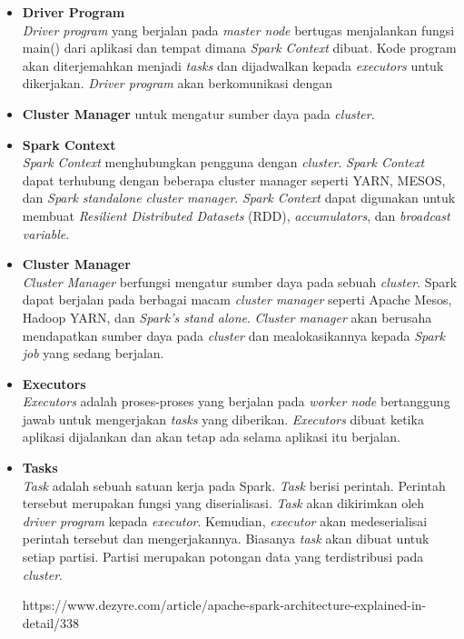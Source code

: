 \begin{itemize} 

\item \textbf{Driver Program}\\
\textit{Driver program} yang berjalan pada \textit{master node} bertugas menjalankan fungsi main() dari aplikasi dan tempat dimana \textit{Spark Context} dibuat. Kode program akan diterjemahkan menjadi \textit{tasks} dan dijadwalkan kepada \textit{executors} untuk dikerjakan. \textit{Driver program} akan berkomunikasi dengan \item \textbf{Cluster Manager} untuk mengatur sumber daya pada \textit{cluster}.\\

\item \textbf{Spark Context}\\
\textit{Spark Context} menghubungkan pengguna dengan \textit{cluster}. \textit{Spark Context} dapat terhubung dengan beberapa cluster manager seperti YARN, MESOS, dan \textit{Spark standalone cluster manager}. \textit{Spark Context} dapat digunakan untuk membuat \textit{Resilient Distributed Datasets} (RDD), \textit{accumulators}, dan \textit{broadcast variable}. 

\item \textbf{Cluster Manager}\\
\textit{Cluster Manager} berfungsi mengatur sumber daya pada sebuah \textit{cluster}. Spark dapat berjalan pada berbagai macam \textit{cluster manager} seperti Apache Mesos, Hadoop YARN, dan \textit{Spark's stand alone}. \textit{Cluster manager} akan berusaha mendapatkan sumber daya pada \textit{cluster} dan mealokasikannya kepada \textit{Spark job} yang sedang berjalan.

\item \textbf{Executors}\\
\textit{Executors} adalah proses-proses yang berjalan pada \textit{worker node} bertanggung jawab untuk mengerjakan \textit{tasks} yang diberikan. \textit{Executors} dibuat ketika aplikasi dijalankan dan akan tetap ada selama aplikasi itu berjalan.

\item \textbf{Tasks}\\
\textit{Task} adalah sebuah satuan kerja pada Spark. \textit{Task} berisi perintah. Perintah tersebut merupakan fungsi yang diserialisasi. \textit{Task} akan dikirimkan oleh \textit{driver program} kepada \textit{executor}. Kemudian, \textit{executor} akan medeserialisai perintah tersebut dan mengerjakannya. Biasanya \textit{task} akan dibuat untuk setiap partisi. Partisi merupakan potongan data yang terdistribusi pada \textit{cluster}.

https://www.dezyre.com/article/apache-spark-architecture-explained-in-detail/338

\end{itemize}







